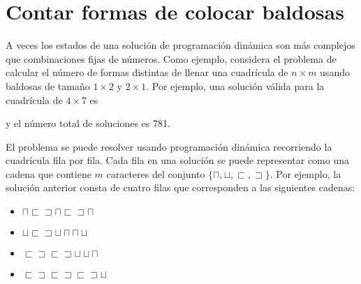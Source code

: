 \section{Contar formas de colocar baldosas}

A veces los estados de una solución de programación dinámica
son más complejos que combinaciones fijas de números.
Como ejemplo,
considera el problema de calcular
el número de formas distintas de
llenar una cuadrícula de $n \times m$ usando
baldosas de tamaño $1 \times 2$ y $2 \times 1$.
Por ejemplo, una solución válida
para la cuadrícula de $4 \times 7$ es
\begin{center}
\end{center}
y el número total de soluciones es 781.

El problema se puede resolver usando programación dinámica
recorriendo la cuadrícula fila por fila.
Cada fila en una solución se puede representar como una
cadena que contiene $m$ caracteres del conjunto
$\{\sqcap, \sqcup, \sqsubset, \sqsupset \}$.
Por ejemplo, la solución anterior consta de cuatro filas
que corresponden a las siguientes cadenas:

\begin{itemize}
    \item $\sqcap \sqsubset \sqsupset \sqcap \sqsubset \sqsupset \sqcap$
    \item $\sqcup \sqsubset \sqsupset \sqcup \sqcap \sqcap \sqcup$
    \item $\sqsubset \sqsupset \sqsubset \sqsupset \sqcup \sqcup \sqcap$
    \item $\sqsubset \sqsupset \sqsubset \sqsupset \sqsubset \sqsupset \sqcup$
\end{itemize}

